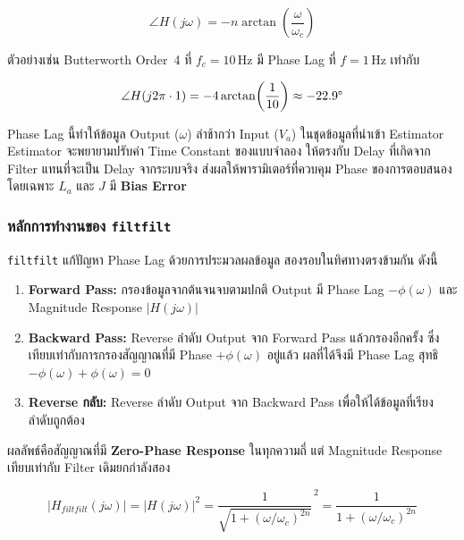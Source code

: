 \begin{equation}
    \angle H(j\omega)
    = -n \arctan\!\left(\frac{\omega}{\omega_c}\right)
    \label{eq:butter_phase}
\end{equation}

ตัวอย่างเช่น Butterworth Order~4 ที่ $f_c = 10$\,Hz
มี Phase Lag ที่ $f = 1$\,Hz เท่ากับ

\begin{equation}
    \angle H(j2\pi \cdot 1)
    = -4\arctan\!\left(\frac{1}{10}\right)
    \approx -22.9\degree
    \label{eq:butter_phase_example}
\end{equation}

Phase Lag นี้ทำให้ข้อมูล Output ($\omega$) ล่าช้ากว่า
Input ($V_a$) ในชุดข้อมูลที่นำเข้า Estimator
Estimator จะพยายามปรับค่า Time Constant ของแบบจำลอง
ให้ตรงกับ Delay ที่เกิดจาก Filter แทนที่จะเป็น
Delay จากระบบจริง
ส่งผลให้พารามิเตอร์ที่ควบคุม Phase ของการตอบสนอง
โดยเฉพาะ $L_a$ และ $J$ มี \textbf{Bias Error}

\subsubsection{หลักการทำงานของ \texttt{filtfilt}}

\texttt{filtfilt} แก้ปัญหา Phase Lag ด้วยการประมวลผลข้อมูล
สองรอบในทิศทางตรงข้ามกัน ดังนี้

\begin{enumerate}
    \item \textbf{Forward Pass:}
          กรองข้อมูลจากต้นจนจบตามปกติ
          Output มี Phase Lag $-\phi(\omega)$
          และ Magnitude Response $|H(j\omega)|$

    \item \textbf{Backward Pass:}
          Reverse ลำดับ Output จาก Forward Pass
          แล้วกรองอีกครั้ง
          ซึ่งเทียบเท่ากับการกรองสัญญาณที่มี
          Phase $+\phi(\omega)$ อยู่แล้ว
          ผลที่ได้จึงมี Phase Lag สุทธิ
          $-\phi(\omega) + \phi(\omega) = 0$

    \item \textbf{Reverse กลับ:}
          Reverse ลำดับ Output จาก Backward Pass
          เพื่อให้ได้ข้อมูลที่เรียงลำดับถูกต้อง
\end{enumerate}

ผลลัพธ์คือสัญญาณที่มี \textbf{Zero-Phase Response}
ในทุกความถี่ แต่ Magnitude Response เทียบเท่ากับ
Filter เดิมยกกำลังสอง

\begin{equation}
    \left|H_{filtfilt}(j\omega)\right|
    = \left|H(j\omega)\right|^2
    = \frac{1}{\sqrt{1 + \left(\omega/\omega_c\right)^{2n}}}^{\,2}
    = \frac{1}{1 + \left(\omega/\omega_c\right)^{2n}}
    \label{eq:filtfilt_mag}
\end{equation}

